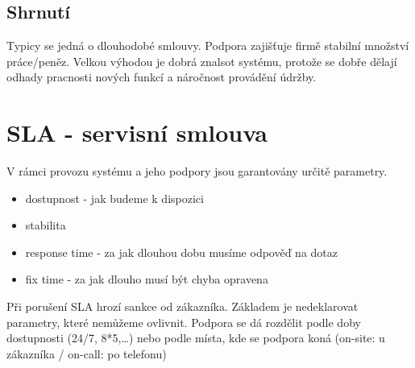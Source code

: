 \documentclass{szzclass}
\begin{document}
\subsection{Shrnutí}
Typicy se jedná o dlouhodobé smlouvy. Podpora zajišťuje firmě stabilní množství práce/peněz. Velkou výhodou je dobrá znalsot systému,
protože se dobře dělají odhady pracnosti nových funkcí a náročnost provádění údržby.
\section{SLA - servisní smlouva}
V rámci provozu systému a jeho podpory jsou garantovány určitě parametry.
\begin{itemize}
    \item dostupnost - jak budeme k dispozici
    \item stabilita
    \item response time - za jak dlouhou dobu musíme odpověď na dotaz
    \item fix time - za jak dlouho musí být chyba opravena
\end{itemize}
Při porušení SLA hrozí sankce od zákazníka. Základem je nedeklarovat parametry, které nemůžeme ovlivnit.
\newline
Podpora se dá rozdělit podle doby dostupnosti (24/7, 8*5,\dots) nebo podle místa, kde se podpora koná (on-site: u zákazníka / on-call: po telefonu)
\end{document}
